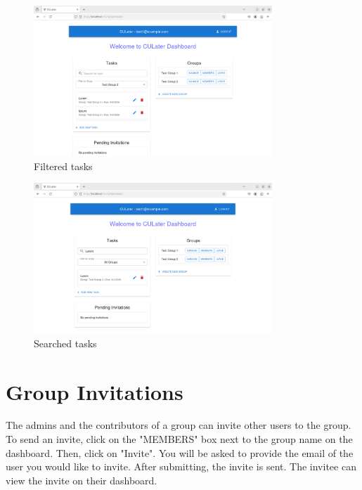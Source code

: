 \documentclass{scrreprt}
\begin{document}
\begin{figure}[htbp]
        \centering
        \includegraphics[width=0.8\textwidth]{filtered.png}
	\caption{Filtered tasks}
	\label{fig:my_label}
\end{figure}
\begin{figure}[htbp]
        \centering
	\includegraphics[width=0.8\textwidth]{searched.png}
	\caption{Searched tasks}
	\label{fig:my_label}
\end{figure}


\chapter{Group Invitations}

The admins and the contributors of a group can invite other users to the group. To send an invite, click on the "MEMBERS" box next to the group name on the dashboard. Then, click on "Invite". You will be asked to provide the email of the user you would like to invite. After submitting, the invite is sent. The invitee can view the invite on their dashboard.\\
\end{document}
